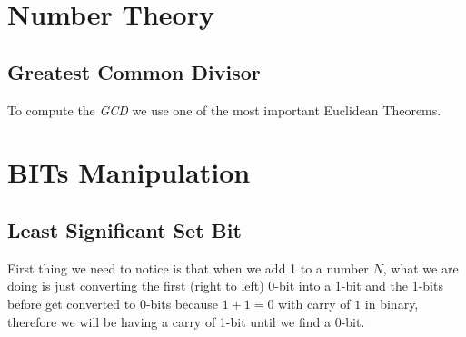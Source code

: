 \documentclass[twoside, openany]{book}
\begin{document}

\thispagestyle{empty}
\newpage
\tableofcontents
\newpage
\begin{multicols*}{2}
\end{multicols*}
{
\part*{Number Theory}
}
{
\chapter*{Greatest Common Divisor}
}
To compute the \textit{GCD} we use one of the most important Euclidean Theorems.


\begin{multicols*}{2}
\end{multicols*}
{
\part*{BITs Manipulation}
}
{
\chapter*{Least Significant Set Bit}
}
\vspace{1em}
\bgroup

First thing we need to notice is that when we add 1 to a number $N$, what we are doing is just converting the first (right to left) 0-bit into a 1-bit and
the 1-bits before get converted to 0-bits because $1 + 1 = 0$ with carry of $1$ in binary, therefore we will be having a carry of 1-bit until we find a 0-bit.\\
\end{document}
